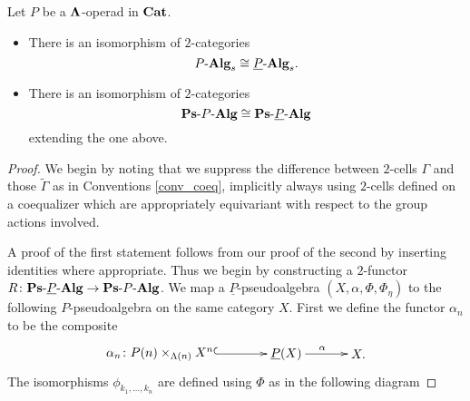 \begin{thm}
Let $P$ be a $\mathbf{\Lambda}$-operad in $\mathbf{Cat}$.
\begin{itemize}
\item There is an isomorphism of $2$-categories
    \[
        P\mbox{-}\mathbf{Alg}_{s} \cong \underline{P}\mbox{-}\mathbf{Alg}_{s}.
    \]
\item There is an isomorphism of $2$-categories
    \[
        \mathbf{Ps}\mbox{-}P\mbox{-}\mathbf{Alg} \cong \mathbf{Ps}\mbox{-}\underline{P}\mbox{-}\mathbf{Alg}
    \]
    extending the one above.
\end{itemize}
\end{thm}
\begin{proof}
We begin by noting that we suppress the difference between $2$-cells $\Gamma$ and those $\tilde{\Gamma}$ as in Conventions \ref{conv_coeq}, implicitly always using $2$-cells defined on a coequalizer which are appropriately equivariant with respect to the group actions involved.

A proof of the first statement follows from our proof of the second by inserting identities where appropriate. Thus we begin by constructing a $2$-functor $R \colon \mathbf{Ps}\mbox{-}\underline{P}\mbox{-}\mathbf{Alg} \rightarrow \mathbf{Ps}\mbox{-}P\mbox{-}\mathbf{Alg}$. We map a $\underline{P}$-pseudoalgebra $(X,\alpha,\Phi,\Phi_\eta)$ to the following $P$-pseudoalgebra on the same category $X$. First we define the functor $\alpha_n$ to be the composite
    \[
        \xy
            (0,0)*+{\alpha_n \colon P(n) \times_{\Lambda(n)} X^n}="00";
            (35,0)*+{\underline{P}(X)}="10";
            (55,0)*+{X.}="20";
            {\ar@{^{(}->} "00" ; "10"};
            {\ar^{\alpha} "10" ; "20"};
        \endxy
    \]
The isomorphisms $\phi_{k_1,\ldots,k_n}$ are defined using $\Phi$ as in the following diagram


\end{proof}

